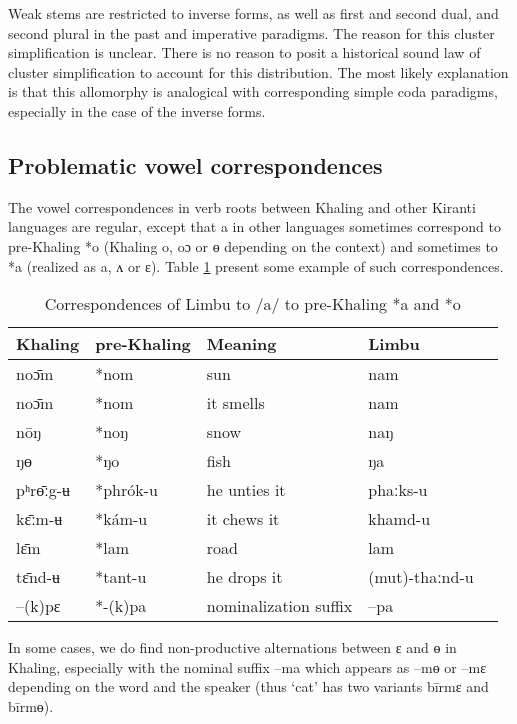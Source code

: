 \documentclass[oldfontcommands,oneside,a4paper,11pt]{article}
\newcommand{\ipa}[1]{{\phon \mbox{#1}}} %
\begin{document}
Weak stems are restricted to inverse forms, as well as first and second dual, and second plural in the past and imperative paradigms. The reason for this cluster simplification is unclear. There is no reason to posit a historical sound law of cluster simplification to account for this distribution. The most likely explanation is that this allomorphy is analogical with corresponding simple coda paradigms, especially in the case of the inverse forms.


\subsection{Problematic vowel correspondences} \label{sec:vowel.correspondences}

The vowel correspondences in verb roots between Khaling and other Kiranti languages are regular, except that \ipa{a} in other languages sometimes correspond to pre-Khaling *o (Khaling \ipa{o}, \ipa{oɔ} or \ipa{ɵ} depending on the context) and sometimes to *a (realized as \ipa{a}, \ipa{ʌ} or \ipa{ɛ}). Table \ref{tab:correspondances.a} present some example of such correspondences.
 
\begin{table}[H]
\caption{Correspondences of Limbu to /a/ to pre-Khaling *a and *o} \centering \label{tab:correspondances.a}
\begin{tabular}{lllll}
Khaling &   pre-Khaling & Meaning &   Limbu \\
\midrule
\ipa{noɔ̄m} & *nom & sun &   \ipa{nam}\\
\ipa{noɔ̄m} & *nom & it smells &   \ipa{nam}\\
\ipa{nōŋ} & *noŋ & snow&   \ipa{naŋ}\\
\ipa{ŋɵ} & *ŋo & fish&   \ipa{ŋa}\\
\ipa{pʰrɵ̄ːg-ʉ} & *phrók-u & he unties it & \ipa{phaːks-u} \\
\midrule
\ipa{kɛ̄ːm-ʉ} &*kám-u & it chews it & \ipa{khamd-u} \\
\ipa{lɛ̄m} & *lam & road & \ipa{lam} \\
\ipa{tɛ̄nd-ʉ} &*tant-u & he drops it & \ipa{(mut)-thaːnd-u}\\
\ipa{--(k)pɛ} & *-(k)pa & nominalization suffix & \ipa{--pa} \\
\bottomrule
\end{tabular}
\end{table}
In some cases, we do find non-productive alternations between \ipa{ɛ} and \ipa{ɵ} in Khaling, especially with the nominal suffix \ipa{--ma} which appears as \ipa{--mɵ} or \ipa{--mɛ} depending on the word and the speaker (thus `cat' has two variants \ipa{bīrmɛ} and \ipa{bīrmɵ}). 
\end{document}
